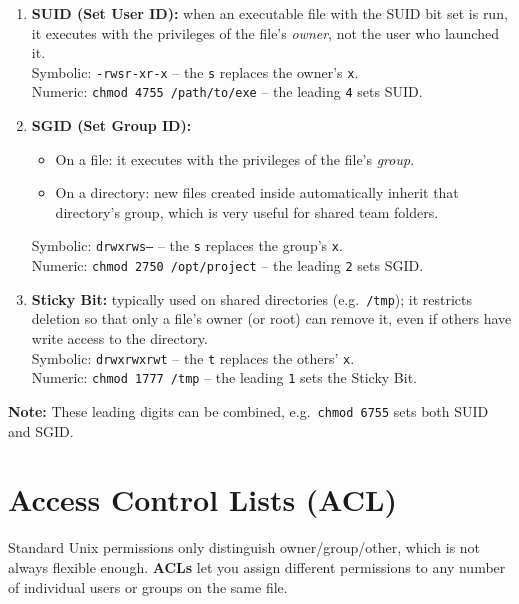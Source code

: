 \begin{enumerate}
    \item \textbf{SUID (Set User ID):} when an executable file with the SUID bit set is run, it executes with the privileges of the file's \emph{owner}, not the user who launched it.\\
    Symbolic: \texttt{-rwsr-xr-x} -- the \texttt{s} replaces the owner's \texttt{x}.\\
    Numeric: \texttt{chmod 4755 /path/to/exe} -- the leading \texttt{4} sets SUID.

    \item \textbf{SGID (Set Group ID):}
    \begin{itemize}
        \item On a file: it executes with the privileges of the file's \emph{group}.
        \item On a directory: new files created inside automatically inherit that directory's group, which is very useful for shared team folders.
    \end{itemize}
    Symbolic: \texttt{drwxrws---} -- the \texttt{s} replaces the group's \texttt{x}.\\
    Numeric: \texttt{chmod 2750 /opt/project} -- the leading \texttt{2} sets SGID.

    \item \textbf{Sticky Bit:} typically used on shared directories (e.g.\ \texttt{/tmp}); it restricts deletion so that only a file's owner (or root) can remove it, even if others have write access to the directory.\\
    Symbolic: \texttt{drwxrwxrwt} -- the \texttt{t} replaces the others' \texttt{x}.\\
    Numeric: \texttt{chmod 1777 /tmp} -- the leading \texttt{1} sets the Sticky Bit.
\end{enumerate}

\textbf{Note:} These leading digits can be combined, e.g.\ \texttt{chmod 6755} sets both SUID and SGID.

\section{Access Control Lists (ACL)}
Standard Unix permissions only distinguish owner/group/other, which is not always flexible enough. \textbf{ACLs} let you assign different permissions to any number of individual users or groups on the same file.

